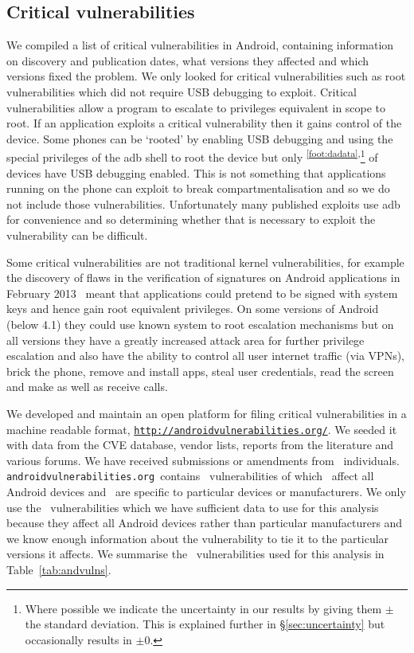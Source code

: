 \documentclass[conference,a4paper,twoside]{IEEEtran}
\let\OldTodo\todo
\renewcommand{\todo}{\OldTodo[inline]}
\newcommand{\todolater}[1]{}%
\newcommand{\dafoot}{\textsuperscript{\ref{foot:dadata}}}
\newcommand{\avo}{\texttt{androidvulnerabilities.org}}
\begin{document}
\subsection{Critical vulnerabilities}
We compiled a list of critical vulnerabilities in Android, containing information on discovery and publication dates, what versions they affected and which versions fixed the problem.
We only looked for critical vulnerabilities such as root vulnerabilities which did not require USB debugging to exploit.
Critical vulnerabilities allow a program to escalate to privileges equivalent in scope to root.
If an application exploits a critical vulnerability then it gains control of the device.
Some phones can be `rooted' by enabling USB debugging and using the special privileges of the adb shell to root the device but only \daAdbEnabledPerc\dafoot\textsuperscript{,}\footnote{Where possible we indicate the uncertainty in our results by giving them $\pm$ the standard deviation. This is explained further in \S\ref{sec:uncertainty} but occasionally results in $\pm0$.} of devices have USB debugging enabled.
This is not something that applications running on the phone can exploit to break compartmentalisation and so we do not include those vulnerabilities.
Unfortunately many published exploits use adb for convenience and so determining whether that is necessary to exploit the vulnerability can be difficult.

Some critical vulnerabilities are not traditional kernel vulnerabilities, for example the discovery of flaws in the verification of signatures on Android applications in February 2013~\cite{Forristal2013} meant that applications could pretend to be signed with system keys and hence gain root equivalent privileges.
On some versions of Android (below 4.1) they could use known system to root escalation mechanisms but on all versions they have a greatly increased attack area for further privilege escalation and also have the ability to control all user internet traffic (via VPNs), brick the phone, remove and install apps, steal user credentials, read the screen and make as well as receive calls.
\todolater{break vulnerabilities down by attack vector?}
\avoTabAndVulns

We developed and maintain an open platform for filing critical vulnerabilities in a machine readable format, \texttt{\url{http://androidvulnerabilities.org/}}.
We seeded it with data from the CVE database, vendor lists, reports from the literature and various forums.
We have received submissions or amendments from \avoNumSubmitters\ individuals.
\avo\ contains \avoNumVulnerabilities\ vulnerabilities of which \avoNumVulnAllAndroid\ affect all Android devices and \avoNumVulnSpecific\ are specific to particular devices or manufacturers.
We only use the \daNumVulnsUsed\ vulnerabilities which we have sufficient data to use for this analysis because they affect all Android devices rather than particular manufacturers and we know enough information about the vulnerability to tie it to the particular versions it affects.
We summarise the \daNumVulnsUsed\ vulnerabilities used for this analysis in Table~\ref{tab:andvulns}.\todolater{We have published full details of the \daNumVulnsUsed\ vulnerabilities used for this analysis in an accompanying technical report~\cite{TODO}}
\end{document}

